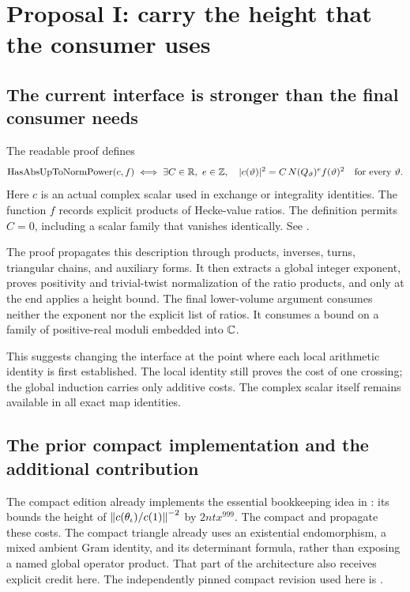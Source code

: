 \section{Proposal I: carry the height that the consumer uses}

\subsection{The current interface is stronger than the final consumer needs}

The readable proof defines
\begin{equation}
 \operatorname{HasAbsUpToNormPower}(c,f)
 \iff
 \exists C\in\mathbb R,\ e\in\mathbb Z,\quad
 |c(\vartheta)|^2=C\,N(Q_\vartheta)^e f(\vartheta)^2
 \quad\text{for every }\vartheta.
\end{equation}
Here \(c\) is an actual complex scalar used in exchange or integrality
identities. The function \(f\) records explicit products of Hecke-value ratios.
The definition permits \(C=0\), including a scalar family that vanishes
identically. See
.

The proof propagates this description through products, inverses, turns,
triangular chains, and auxiliary forms. It then extracts a global integer
exponent, proves positivity and trivial-twist normalization of the ratio
products, and only at the end applies a height bound.
The final lower-volume argument consumes neither the exponent nor the
explicit list of ratios. It consumes a bound on a family of positive-real
moduli embedded into \(\mathbb C\).

This suggests changing the interface at the point where each local
arithmetic identity is first established. The local identity still proves
the cost of one crossing; the global induction carries only additive costs.
The complex scalar itself remains available in all exact map identities.

\subsection{The prior compact implementation and the additional contribution}

The compact edition already implements the essential bookkeeping idea in
:
its  bounds the height of
\(\left\lVert c(\theta_\iota)/c(1)\right\rVert^{-2}\) by \(2ntx^{999}\).
The compact
 and
 propagate these costs.
The compact triangle already uses an existential endomorphism, a mixed
ambient Gram identity, and its determinant formula, rather than exposing
a named global operator product. That part of the architecture also
receives explicit credit here.
The independently pinned compact revision used here is
.

